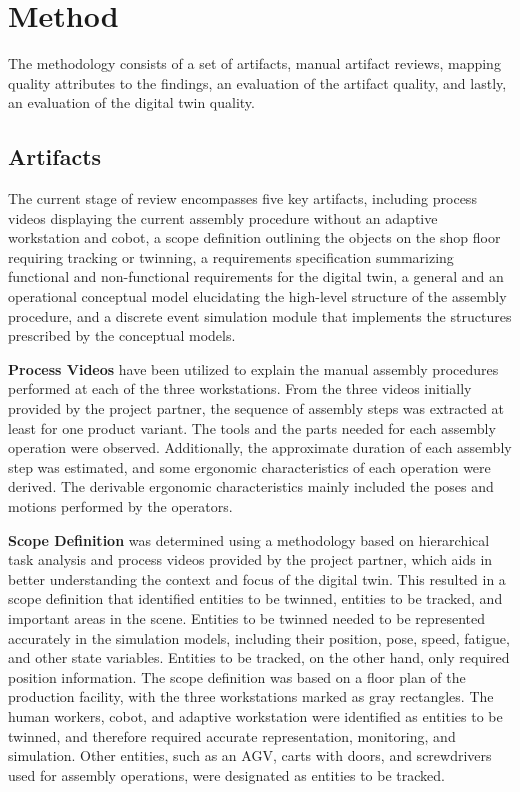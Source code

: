 \documentclass{llncs}
\begin{document}
    \section{Method}
    The methodology consists of a set of artifacts, manual artifact reviews, mapping quality attributes to the findings, an evaluation of the artifact quality, and lastly, an evaluation of the digital twin quality.   
    \subsection{Artifacts}\label{section:Artifacts}
    The current stage of review encompasses five key artifacts, including process videos displaying the current assembly procedure without an adaptive workstation and cobot,
     a scope definition outlining the objects on the shop floor requiring tracking or twinning, a requirements 
     specification summarizing functional and non-functional requirements for the digital twin, a general and an operational 
     conceptual model elucidating the high-level structure of the assembly procedure, 
    and a discrete event simulation module that implements the structures prescribed by the conceptual models.

    \textbf{Process Videos} have been utilized to explain the manual assembly procedures performed at each of the three workstations. From the three videos initially provided by the project partner,  
    the sequence of assembly steps was extracted at least for one product variant. The tools and the parts needed for each assembly operation were observed. Additionally, the approximate duration of each assembly step 
    was estimated, and some ergonomic characteristics of each operation were derived. 
    The derivable ergonomic characteristics mainly included the poses and motions performed by the operators.

    \textbf{Scope Definition} was determined using a methodology based on hierarchical task analysis and process videos provided by the project partner, which aids in better understanding the context and focus of the digital twin.
    This resulted in a scope definition that identified entities to be twinned, entities to be tracked, and important areas in the scene. 
    Entities to be twinned needed to be represented accurately in the simulation models, including their position, pose, speed, fatigue, and other state variables. 
    Entities to be tracked, on the other hand, only required position information. The scope definition was based on a floor plan of the production facility, with the three workstations marked as gray rectangles. 
    The human workers, cobot, and adaptive workstation were identified as entities to be twinned, and therefore required accurate representation, 
    monitoring, and simulation. Other entities, such as an AGV, carts with doors, and screwdrivers used for assembly operations, were designated as entities to be tracked.
\end{document}
